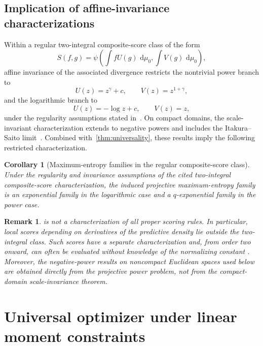 \documentclass[pdflatex,sn-mathphys-num]{sn-jnl}
\theoremstyle{thmstyleone}
\newtheorem{corollary}{Corollary}
\theoremstyle{thmstyletwo}
\newtheorem{remark}{Remark}
\theoremstyle{thmstylethree}
\newcommand{\dd}{\,\mathrm{d}}
\begin{document}
\subsection{Implication of affine-invariance characterizations}

Within a regular two-integral composite-score class of the form
\[
 S(f,g)=\psi\!\left(\int fU(g)\,\dd\mu_0,\int V(g)\,\dd\mu_0\right),
\]
affine invariance of the associated divergence restricts the nontrivial power branch to
\[
 U(z)=z^\gamma+c,
 \qquad
 V(z)=z^{1+\gamma},
\]
and the logarithmic branch to
\[
 U(z)=-\log z+c,
 \qquad
 V(z)=z,
\]
under the regularity assumptions stated in~\citet{KanamoriFujisawa2014Bernoulli}. On compact domains, the scale-invariant characterization extends to negative powers and includes the Itakura--Saito limit~\citep{Kanamori2014Entropy}. Combined with~\cref{thm:universality}, these results imply the following restricted characterization.

\begin{corollary}[Maximum-entropy families in the regular composite-score class]\label{cor:composite-characterization}
Under the regularity and invariance assumptions of the cited two-integral composite-score characterization, the induced projective maximum-entropy family is an exponential family in the logarithmic case and a $q$-exponential family in the power case.
\end{corollary}

\begin{remark}
 is not a characterization of all proper scoring rules. In particular, local scores depending on derivatives of the predictive density lie outside the two-integral class. Such scores have a separate characterization and, from order two onward, can often be evaluated without knowledge of the normalizing constant \citep{ParryDawidLauritzen2012}. Moreover, the negative-power results on noncompact Euclidean spaces used below are obtained directly from the projective power problem, not from the compact-domain scale-invariance theorem.
\end{remark}

\section{Universal optimizer under linear moment constraints}\label{sec:qexp}
\end{document}
